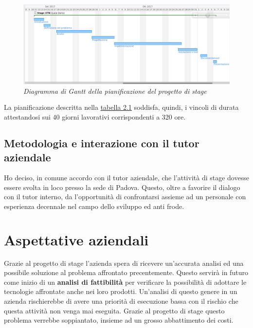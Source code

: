 \begin{figure}[h!]
	\includegraphics[scale=0.4]{immagini/gant.png}
	\caption{\textit{Diagramma di Gantt della pianificazione del progetto di stage}}
\end{figure}
La pianificazione descritta nella \hyperref[tab:pian]{tabella 2.1} soddisfa, quindi, i vincoli di durata attestandosi sui 40 giorni lavorativi corrispondenti a 320 ore.\\
\subsection{Metodologia e interazione con il tutor aziendale}
Ho deciso, in comune accordo con il tutor aziendale, che l'attività di stage dovesse essere svolta in loco presso la sede di Padova. Questo, oltre a favorire il dialogo con il tutor interno, da l'opportunità di confrontarsi assieme ad un personale con esperienza decennale nel campo dello sviluppo ed anti frode.
\newpage

\section{Aspettative aziendali}
Grazie al progetto di stage l'azienda spera di ricevere un'accurata analisi ed una possibile soluzione al problema affrontato precentemente. Questo servirà in futuro come inizio di un \textbf{analisi di fattibilità} per verificare la possibilità di adottare le tecnologie affrontate anche nei loro prodotti. Un'analisi di questo genere in un azienda rischierebbe di avere una priorità di esecuzione bassa con il rischio che questa attività non venga mai eseguita. Grazie al progetto di stage questo problema verrebbe soppiantato, insieme ad  un grosso abbattimento dei costi.

